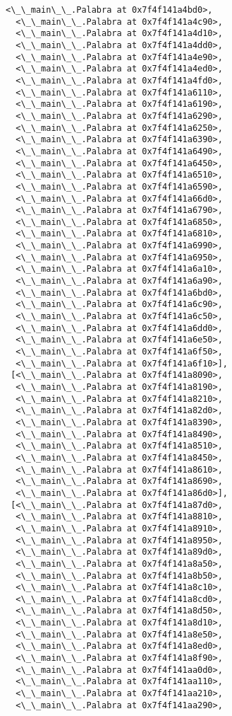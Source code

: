 \documentclass[12pt,a4paper,table]{article}
\begin{document}
\begin{tcolorbox}[breakable, size=fbox, boxrule=.5pt, pad at break*=1mm, opacityfill=0]
\begin{Verbatim}[commandchars=\\\{\}]
  <\_\_main\_\_.Palabra at 0x7f4f141a4bd0>,
  <\_\_main\_\_.Palabra at 0x7f4f141a4c90>,
  <\_\_main\_\_.Palabra at 0x7f4f141a4d10>,
  <\_\_main\_\_.Palabra at 0x7f4f141a4dd0>,
  <\_\_main\_\_.Palabra at 0x7f4f141a4e90>,
  <\_\_main\_\_.Palabra at 0x7f4f141a4ed0>,
  <\_\_main\_\_.Palabra at 0x7f4f141a4fd0>,
  <\_\_main\_\_.Palabra at 0x7f4f141a6110>,
  <\_\_main\_\_.Palabra at 0x7f4f141a6190>,
  <\_\_main\_\_.Palabra at 0x7f4f141a6290>,
  <\_\_main\_\_.Palabra at 0x7f4f141a6250>,
  <\_\_main\_\_.Palabra at 0x7f4f141a6390>,
  <\_\_main\_\_.Palabra at 0x7f4f141a6490>,
  <\_\_main\_\_.Palabra at 0x7f4f141a6450>,
  <\_\_main\_\_.Palabra at 0x7f4f141a6510>,
  <\_\_main\_\_.Palabra at 0x7f4f141a6590>,
  <\_\_main\_\_.Palabra at 0x7f4f141a66d0>,
  <\_\_main\_\_.Palabra at 0x7f4f141a6790>,
  <\_\_main\_\_.Palabra at 0x7f4f141a6850>,
  <\_\_main\_\_.Palabra at 0x7f4f141a6810>,
  <\_\_main\_\_.Palabra at 0x7f4f141a6990>,
  <\_\_main\_\_.Palabra at 0x7f4f141a6950>,
  <\_\_main\_\_.Palabra at 0x7f4f141a6a10>,
  <\_\_main\_\_.Palabra at 0x7f4f141a6a90>,
  <\_\_main\_\_.Palabra at 0x7f4f141a6bd0>,
  <\_\_main\_\_.Palabra at 0x7f4f141a6c90>,
  <\_\_main\_\_.Palabra at 0x7f4f141a6c50>,
  <\_\_main\_\_.Palabra at 0x7f4f141a6dd0>,
  <\_\_main\_\_.Palabra at 0x7f4f141a6e50>,
  <\_\_main\_\_.Palabra at 0x7f4f141a6f50>,
  <\_\_main\_\_.Palabra at 0x7f4f141a6f10>],
 [<\_\_main\_\_.Palabra at 0x7f4f141a8090>,
  <\_\_main\_\_.Palabra at 0x7f4f141a8190>,
  <\_\_main\_\_.Palabra at 0x7f4f141a8210>,
  <\_\_main\_\_.Palabra at 0x7f4f141a82d0>,
  <\_\_main\_\_.Palabra at 0x7f4f141a8390>,
  <\_\_main\_\_.Palabra at 0x7f4f141a8490>,
  <\_\_main\_\_.Palabra at 0x7f4f141a8510>,
  <\_\_main\_\_.Palabra at 0x7f4f141a8450>,
  <\_\_main\_\_.Palabra at 0x7f4f141a8610>,
  <\_\_main\_\_.Palabra at 0x7f4f141a8690>,
  <\_\_main\_\_.Palabra at 0x7f4f141a86d0>],
 [<\_\_main\_\_.Palabra at 0x7f4f141a87d0>,
  <\_\_main\_\_.Palabra at 0x7f4f141a8810>,
  <\_\_main\_\_.Palabra at 0x7f4f141a8910>,
  <\_\_main\_\_.Palabra at 0x7f4f141a8950>,
  <\_\_main\_\_.Palabra at 0x7f4f141a89d0>,
  <\_\_main\_\_.Palabra at 0x7f4f141a8a50>,
  <\_\_main\_\_.Palabra at 0x7f4f141a8b50>,
  <\_\_main\_\_.Palabra at 0x7f4f141a8c10>,
  <\_\_main\_\_.Palabra at 0x7f4f141a8cd0>,
  <\_\_main\_\_.Palabra at 0x7f4f141a8d50>,
  <\_\_main\_\_.Palabra at 0x7f4f141a8d10>,
  <\_\_main\_\_.Palabra at 0x7f4f141a8e50>,
  <\_\_main\_\_.Palabra at 0x7f4f141a8ed0>,
  <\_\_main\_\_.Palabra at 0x7f4f141a8f90>,
  <\_\_main\_\_.Palabra at 0x7f4f141aa0d0>,
  <\_\_main\_\_.Palabra at 0x7f4f141aa110>,
  <\_\_main\_\_.Palabra at 0x7f4f141aa210>,
  <\_\_main\_\_.Palabra at 0x7f4f141aa290>,

\end{Verbatim}
\end{tcolorbox}
\end{document}
